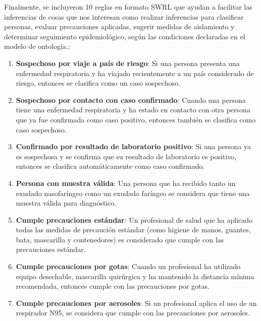 \documentclass[11pt, letterpaper]{article}
\begin{document}
\begin{itemize}
\end{itemize}

Finalmente, se incluyeron 10 reglas en formato SWRL que ayudan a facilitar las inferencias de cosas que nos interesan como realizar inferencias para clasificar personas, evaluar precauciones aplicadas, sugerir medidas de aislamiento y determinar seguimiento epidemiológico, según las condiciones declaradas en el modelo de ontología.:


\begin{enumerate}
	\item \textbf{Sospechoso por viaje a país de riesgo}: Si una persona presenta una enfermedad respiratoria y ha viajado recientemente a un país considerado de riesgo, entonces se clasifica como un caso sospechoso.
	
	\item \textbf{Sospechoso por contacto con caso confirmado}: Cuando una persona tiene una enfermedad respiratoria y ha estado en contacto con otra persona que ya fue confirmada como caso positivo, entonces también se clasifica como caso sospechoso.
	
	\item \textbf{Confirmado por resultado de laboratorio positivo}: Si una persona ya es sospechosa y se confirma que su resultado de laboratorio es positivo, entonces se clasifica automáticamente como caso confirmado.
	
	\item \textbf{Persona con muestra válida}: Una persona que ha recibido tanto un exudado nasofaríngeo como un exudado faríngeo se considera que tiene una muestra válida para diagnóstico.
	
	\item \textbf{Cumple precauciones estándar}: Un profesional de salud que ha aplicado todas las medidas de precaución estándar (como higiene de manos, guantes, bata, mascarilla y contenedores) es considerado que cumple con las precauciones estándar.
	
	\item \textbf{Cumple precauciones por gotas}: Cuando un profesional ha utilizado equipo desechable, mascarilla quirúrgica y ha mantenido la distancia mínima recomendada, entonces cumple con las precauciones por gotas.
	
	\item \textbf{Cumple precauciones por aerosoles}: Si un profesional aplica el uso de un respirador N95, se considera que cumple con las precauciones por aerosoles.
	

\end{enumerate}
\end{document}

